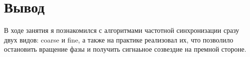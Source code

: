 \chapter{Вывод}
\label{ch:chap3}

В ходе занятия я познакомился с алгоритмами частотной синхронизации сразу двух видов: coarse и fine, а также на практике реализовал их,
что позволило остановить вращение фазы и получить сигнаьное созвездие на премной стороне.
\endinput